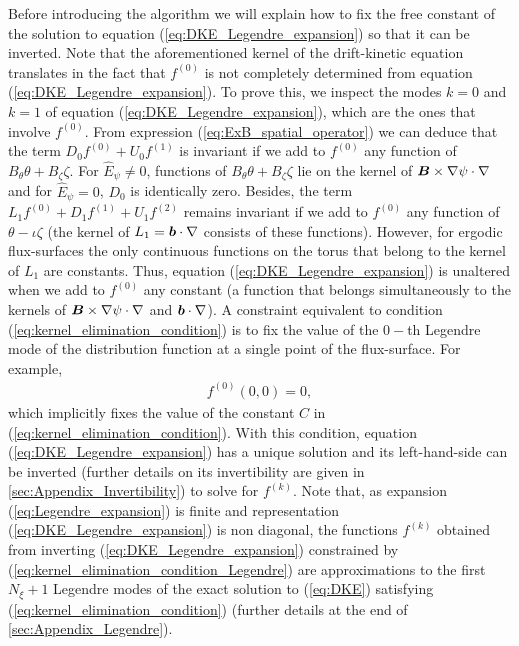 Before introducing the algorithm we will explain how to fix the free constant of the solution to equation (\ref{eq:DKE_Legendre_expansion}) so that it can be inverted. Note that the aforementioned kernel of the drift-kinetic equation translates in the fact that $f^{(0)}$ is not completely determined from equation (\ref{eq:DKE_Legendre_expansion}). To prove this, we inspect the modes $k=0$ and $k=1$ of equation (\ref{eq:DKE_Legendre_expansion}), which are the ones that involve $f^{(0)}$. From expression (\ref{eq:ExB_spatial_operator}) we can deduce that the term $D_0 f^{(0)} + U_0 f^{(1)} $ is invariant if we add to $f^{(0)}$ any function of $B_\theta \theta + B_\zeta  \zeta$. For $\hat{E}_\psi\ne 0$, functions of $B_\theta \theta + B_\zeta  \zeta$ lie on the kernel of $\vb*{B}\times\nabla \psi \cdot \nabla$ and for $\hat{E}_\psi = 0$, $D_0$ is identically zero. Besides, the term $L_1 f^{(0)} + D_1 f^{(1)} + U_1 f^{(2)}$ remains invariant if we add to $f^{(0)} $ any function of $\theta-\iota\zeta$ (the kernel of $L_1=\vb*{b}\cdot\nabla$ consists of these functions). However, for ergodic flux-surfaces the only continuous functions on the torus that belong to the kernel of $L_1$ are constants. Thus, equation (\ref{eq:DKE_Legendre_expansion}) is unaltered when we add to $f^{(0)}$ any constant (a function that belongs simultaneously to the kernels of $\vb*{B}\times\nabla \psi \cdot \nabla$ and $\vb*{b}\cdot\nabla$). A constraint equivalent to condition (\ref{eq:kernel_elimination_condition}) is to fix the value of the $0-$th Legendre mode of the distribution function at a single point of the flux-surface. For example,
 \begin{align}
 	f^{(0)}(0,0)=0, \label{eq:kernel_elimination_condition_Legendre}
 \end{align}
which implicitly fixes the value of the constant $C$ in (\ref{eq:kernel_elimination_condition}).
 With this condition, equation (\ref{eq:DKE_Legendre_expansion}) has a unique solution and its left-hand-side can be inverted (further details on its invertibility are given in \ref{sec:Appendix_Invertibility}) to solve for $f^{(k)}$. Note that, as expansion (\ref{eq:Legendre_expansion}) is finite and representation (\ref{eq:DKE_Legendre_expansion}) is non diagonal, the functions $f^{(k)}$ obtained from inverting (\ref{eq:DKE_Legendre_expansion}) constrained by (\ref{eq:kernel_elimination_condition_Legendre}) are approximations to the first $N_\xi+1$ Legendre modes of the exact solution to (\ref{eq:DKE}) satisfying (\ref{eq:kernel_elimination_condition}) (further details at the end of \ref{sec:Appendix_Legendre}).
 
